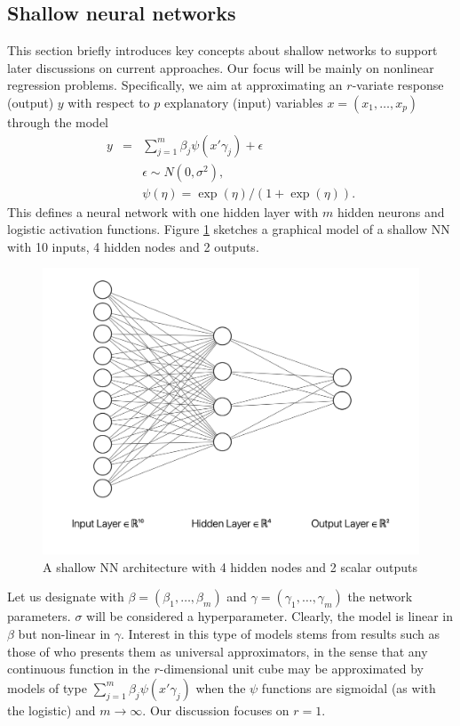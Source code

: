 \subsection{Shallow neural networks}
This section briefly introduces key concepts
about shallow networks to support later discussions on current approaches.
Our focus will be mainly on nonlinear regression 
problems. Specifically, we aim at approximating 
an $r$-variate response (output) $y$ with respect to $p$ explanatory 
(input) variables $x=(x_1,\ldots,x_p)$ through the 
model
\begin{eqnarray}\label{kantora}
  y         & = & \sum_{j=1}^m \beta_j \psi(x' \gamma_j) +
                    \epsilon %
                    \nonumber\\
              & & \epsilon \sim N(0,\sigma^2),
                  \nonumber \\
              & & \psi(\eta) = \exp(\eta)/(1+\exp(\eta)).
                  \end{eqnarray}
This defines a neural network with one hidden 
layer with $m$ hidden neurons and logistic 
activation functions.
Figure \ref{figuradkk1} sketches 
a graphical model of a shallow NN with 10 inputs, 4 hidden nodes and 
2 outputs. 
\begin{figure}
    \centering
    \includegraphics[scale=0.5]{figures/net1.png}
    \caption{A shallow NN architecture with 4 hidden nodes and 2 scalar outputs}
    \label{figuradkk1}
\end{figure}

Let us designate with $\beta=(\beta_1,\ldots,\beta_m)$ and $\gamma=(\gamma_1,\ldots,\gamma_m)$ the network parameters. $\sigma$  
will be considered a hyperparameter. Clearly, the model
is linear in $\beta$ but non-linear in  
$\gamma$. Interest in this type of models stems from 
results such as those of \cite{cybenko1989approximation}
who presents them as universal approximators,
in the sense that any continuous function in the 
$r$-dimensional unit cube 
may be approximated by models of type
$\sum_{j=1}^m \beta_j \psi(x' \gamma_j)$
when the $\psi$
functions are sigmoidal (as with the logistic) and
$m\rightarrow \infty$. Our discussion focuses on $r=1$.



